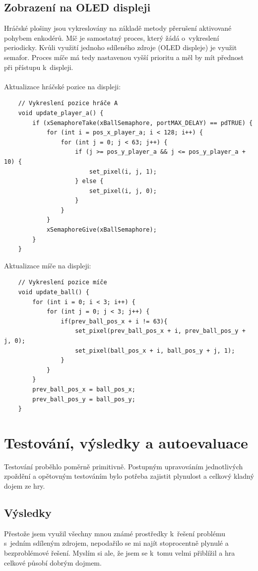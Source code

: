 \documentclass[a4paper,11pt]{article}
\begin{document}
\subsection{Zobrazení na OLED displeji}
Hráčské plošiny jsou vykreslovány na základě metody přerušení aktivované pohybem enkodérů.
Míč je samostatný proces, který žádá o~vykreslení periodicky.
Kvůli využití jednoho sdíleného zdroje (OLED displeje) je využit semafor.
Proces míče má tedy nastavenou vyšší prioritu a měl by mít přednost při přístupu k~displeji.
\\ \\ \noindent
Aktualizace hráčské pozice na displeji:
\begin{verbatim}
    // Vykreslení pozice hráče A
    void update_player_a() {
        if (xSemaphoreTake(xBallSemaphore, portMAX_DELAY) == pdTRUE) {
            for (int i = pos_x_player_a; i < 128; i++) {
                for (int j = 0; j < 63; j++) {
                    if (j >= pos_y_player_a && j <= pos_y_player_a + 10) {
                        set_pixel(i, j, 1);
                    } else {
                        set_pixel(i, j, 0);
                    } 
                }
            }
            xSemaphoreGive(xBallSemaphore);
        }
    }
\end{verbatim}

Aktualizace míče na displeji:
\begin{verbatim}
    // Vykreslení pozice míče
    void update_ball() {
        for (int i = 0; i < 3; i++) {
            for (int j = 0; j < 3; j++) {
                if(prev_ball_pos_x + i != 63){
                    set_pixel(prev_ball_pos_x + i, prev_ball_pos_y + j, 0);
                    set_pixel(ball_pos_x + i, ball_pos_y + j, 1);
                }
            }
        }
        prev_ball_pos_x = ball_pos_x;
        prev_ball_pos_y = ball_pos_y;
    }
\end{verbatim}

\section{Testování, výsledky a autoevaluace}
Testování proběhlo poměrně primitivně. Postupným upravováním jednotlivých zpoždění a opětovným testováním bylo potřeba zajistit plynulost a celkový kladný dojem ze hry.

\subsection{Výsledky}
Přestože jsem využil všechny mnou známé prostředky k~řešení problému s~jedním sdíleným zdrojem, nepodařilo se mi najít stoprocentně plynulé a bezproblémové řešení.
Myslím si ale, že jsem se k~tomu velmi přiblížil a hra celkové působí dobrým dojmem.
\end{document}
